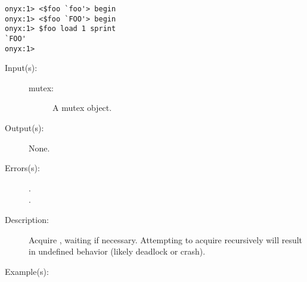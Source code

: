 \begin{description}
\begin{description}
\begin{verbatim}
onyx:1> <$foo `foo'> begin
onyx:1> <$foo `FOO'> begin
onyx:1> $foo load 1 sprint
`FOO'
onyx:1>
		\end{verbatim}
	\end{description}
\label{systemdict:lock}
\item[{\onyxop{mutex}{lock}{--}}: ]
	\begin{description}\item[]
	\item[Input(s): ]
		\begin{description}\item[]
		\item[mutex: ]
			A mutex object.
		\end{description}
	\item[Output(s): ] None.
	\item[Errors(s): ]
		\begin{description}\item[]
		\item[.]
		\item[.]
		\end{description}
	\item[Description: ]
		Acquire , waiting if necessary.  Attempting to
		acquire  recursively will result in undefined
		behavior (likely deadlock or crash).
	\item[Example(s): ]\begin{verbatim}


\end{verbatim}
\end{description}
\end{description}
